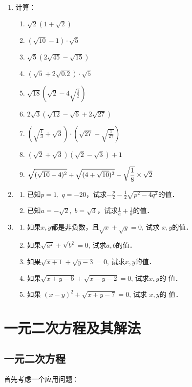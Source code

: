 \begin{enumerate}
\item 计算：
\begin{enumerate}
    \item $\sqrt{2}(1+\sqrt{2})$
    \item $(\sqrt{10}-1)\cdot \sqrt{5}$
    \item $\sqrt{5}(2\sqrt{45}-\sqrt{15})$
    \item $(\sqrt{5}+2\sqrt{0.2})\cdot \sqrt{5}$
    \item $\sqrt{18}\left(\sqrt{2}-4\sqrt{\frac{1}{2}}\right)$
    \item $2\sqrt{3}\left(\sqrt{12}-\sqrt{6}+2\sqrt{27}\right)$
    \item $\left(\sqrt{\frac{1}{3}}+\sqrt{3}\right)\cdot \left(\sqrt{27}-\sqrt{\frac{1}{27}}\right)$
    \item $(\sqrt{2}+\sqrt{3})(\sqrt{2}-\sqrt{3})+1$
    \item $\sqrt{(\sqrt{10}-4)^2}+\sqrt{(4+\sqrt{10})^2}-\sqrt{\dfrac{1}{8}}\times \sqrt{2}$
\end{enumerate}

\item \begin{enumerate}
    \item 已知$p=1, \; q=-20$，试求$-\frac{p}{2}-\frac{1}{2}\sqrt{p^2-4q^2}$的值．
    \item 已知$a=-\sqrt{2},\; b=\sqrt{3}$，试求$\frac{1}{a}+\frac{1}{b}$的值． 
\end{enumerate}

\item  \begin{enumerate}
    \item 如果$x,y$都是非负数，且$\sqrt{x}+\sqrt{y}=0$, 试求
$x,y$的值．
\item 如果$\sqrt{a^2}+\sqrt{b^2}=0$, 试求$a,b$的值．
\item 如果$\sqrt{x+1}+\sqrt{y-3}=0$, 试求$x,y$的值．
\item 如果$\sqrt{x+y-6}+\sqrt{x-y-2}=0$, 试求$x,y$的
值．
\item 如果
$(x-y)^2+\sqrt{x+y-7}=0$, 试求 $x,y$的
值．
\end{enumerate}

\end{enumerate}

\section{一元二次方程及其解法}
\subsection{一元二次方程}
首先考虑一个应用问题：

